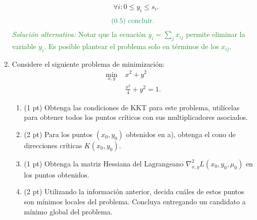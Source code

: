 \documentclass{article}
\begin{document}
\begin{enumerate}
\begin{align*}
				   & \forall i : 0 \leq y_i \leq s_i.
		\end{align*}
		\[
			\text{\textcolor{ForestGreen}{(0.5) concluir.}}
		\]
		\textcolor{ForestGreen}{\textit{Solución alternativa:} Notar que la ecuación \(y_i = \sum_{j} x_{ij} \) permite eliminar la variable \(y_i\). Es posible plantear el problema solo en términos de los \(x_{ij}\).}
	\item Considere el siguiente problema de minimización:
		\begin{align*}
			\min_{x, y} \; & x^2 + y^2 \\
				       & \frac{x^2}{4} + y^2 = 1.
		\end{align*}
		\begin{enumerate}
			\item (1 pt) Obtenga las condiciones de KKT para este problema, utilícelas para obtener todos los puntos críticos con sus multiplicadores asociados.
			\item (2 pt) Para los puntos \((x_0, y_0)\) obtenidos en a), obtenga el cono de direcciones críticas \(K(x_0, y_0)\).
			\item (1 pt) Obtenga la matriz Hessiana del Lagrangeano \(\nabla_{x, y}^2 L(x_0, y_0, \mu_0)\) en los puntos obtenidos.
			\item (2 pt) Utilizando la información anterior, decida cuáles de estos puntos son mínimos locales del problema. Concluya entregando un candidato a mínimo global del problema.
		\end{enumerate}


\end{enumerate}
\end{document}
